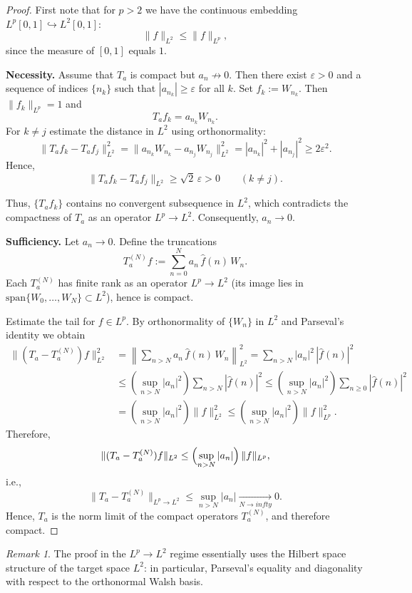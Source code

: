 \documentclass[a4paper,12pt]{article}
\theoremstyle{definition}
\theoremstyle{remark}
\newtheorem{remark}[theorem]{Remark}
\theoremstyle{definition}
\def\infty{infty}%
\begin{document}
\begin{proof}
First note that for $p>2$ we have the continuous embedding
$L^p[0,1]\hookrightarrow L^2[0,1]$:
\[
\|f\|_{L^2}\le \|f\|_{L^p},
\]
since the measure of $[0,1]$ equals $1$.

\medskip
\textbf{Necessity.}
Assume that $T_a$ is compact but $a_n\nrightarrow 0$.
Then there exist $\varepsilon>0$ and a sequence of indices $\{n_k\}$ such that
$|a_{n_k}|\ge \varepsilon$ for all $k$.
Set $f_k:=W_{n_k}$. Then $\|f_k\|_{L^p}=1$ and
\[
T_af_k=a_{n_k}W_{n_k}.
\]
For $k\neq j$ estimate the distance in $L^2$ using orthonormality:
\[
\|T_af_k-T_af_j\|_{L^2}^2
=\|a_{n_k}W_{n_k}-a_{n_j}W_{n_j}\|_{L^2}^2
=|a_{n_k}|^2+|a_{n_j}|^2
\ge 2\varepsilon^2.
\]
Hence,
\[
\|T_af_k-T_af_j\|_{L^2}\ge \sqrt{2}\,\varepsilon>0
\qquad (k\neq j).
\]

Thus, $\{T_af_k\}$ contains no convergent subsequence in $L^2$,
which contradicts the compactness of $T_a$ as an operator $L^p\to L^2$.
Consequently, $a_n\to 0$.

\medskip
\textbf{Sufficiency.}
Let $a_n\to 0$.
Define the truncations
\[
T_a^{(N)}f:=\sum_{n=0}^N a_n\,\hat{f}(n)\,W_n.
\]
Each $T_a^{(N)}$ has finite rank as an operator $L^p\to L^2$
(its image lies in $\mathrm{span}\{W_0,\dots,W_N\}\subset L^2$),
hence is compact.

Estimate the tail for $f\in L^p$.
By orthonormality of $\{W_n\}$ in $L^2$ and Parseval's identity we obtain
\begin{align*}
\|(T_a-T_a^{(N)})f\|_{L^2}^2
&=\left\|\sum_{n>N} a_n\,\hat{f}(n)\,W_n\right\|_{L^2}^2
=\sum_{n>N}|a_n|^2\,|\hat{f}(n)|^2\\
&\le \left(\sup_{n>N}|a_n|^2\right)\sum_{n>N}|\hat{f}(n)|^2
\le \left(\sup_{n>N}|a_n|^2\right)\sum_{n\ge0}|\hat{f}(n)|^2\\
&=\left(\sup_{n>N}|a_n|^2\right)\|f\|_{L^2}^2
\le \left(\sup_{n>N}|a_n|^2\right)\|f\|_{L^p}^2.
\end{align*}
Therefore,
\[
\|(T_a-T_a^{(N)})f\|_{L^2}\le \Bigl(\sup_{n>N}|a_n|\Bigr)\,\|f\|_{L^p},
\]
i.e.,
\[
\|T_a-T_a^{(N)}\|_{L^p\to L^2}\le \sup_{n>N}|a_n|\xrightarrow[N\to\infty]{}0.
\]
Hence, $T_a$ is the norm limit of the compact operators $T_a^{(N)}$,
and therefore compact.
\end{proof}

\begin{remark}
The proof in the $L^p\to L^2$ regime essentially uses the Hilbert space structure of the target space $L^2$:
in particular, Parseval's equality and diagonality with respect to the orthonormal Walsh basis.
\end{remark}
\end{document}
